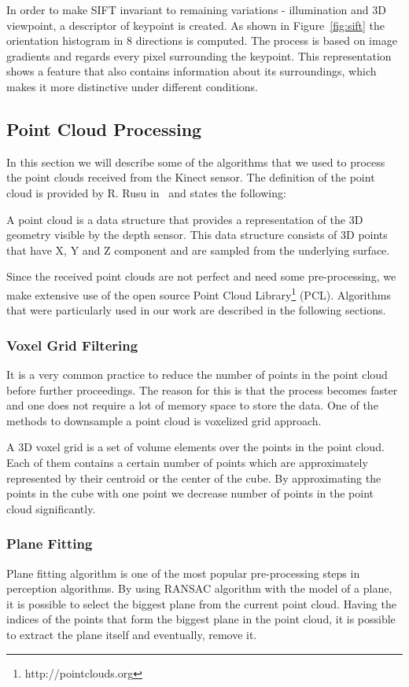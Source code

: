 In order to make SIFT invariant to remaining variations - illumination and 3D viewpoint, a descriptor of keypoint is created. As shown in Figure~\ref{fig:sift} the orientation histogram in 8 directions is computed. The process is based on image gradients and regards every pixel surrounding the keypoint. This representation shows a feature that also contains information about its surroundings, which makes it more distinctive under different conditions.


\subsection{Point Cloud Processing}
In this section we will describe some of the algorithms that we used to process the point clouds received from the Kinect sensor. The definition of the point cloud is provided by R. Rusu in~\cite{Rusu_ICRA2011_PCL} and states the following:

A point cloud is a data structure that provides a representation of the 3D geometry visible by the depth sensor. This data structure consists of 3D points that have X, Y and Z component and are sampled from the underlying surface.  

Since the received point clouds are not perfect and need some pre-processing, we make extensive use of the open source Point Cloud Library\footnote{http://pointclouds.org} (PCL). Algorithms that were particularly used in our work are described in the following sections.

\subsubsection{Voxel Grid Filtering}
It is a very common practice to reduce the number of points in the point cloud before further proceedings. The reason for this is that the process becomes faster and one does not require a lot of memory space to store the data. One of the methods to downsample a point cloud is voxelized grid approach.

A 3D voxel grid is a set of volume elements over the points in the point cloud. Each of them contains a certain number of points which are approximately represented by their centroid or the center of the cube. By approximating the points in the cube with one point we decrease number of points in the point cloud significantly. 

\subsubsection{Plane Fitting}
Plane fitting algorithm is one of the most popular pre-processing steps in perception algorithms. By using RANSAC algorithm with the model of a plane, it is possible to select the biggest plane from the current point cloud. Having the indices of the points that form the biggest plane in the point cloud, it is possible to extract the plane itself and eventually, remove it. 

